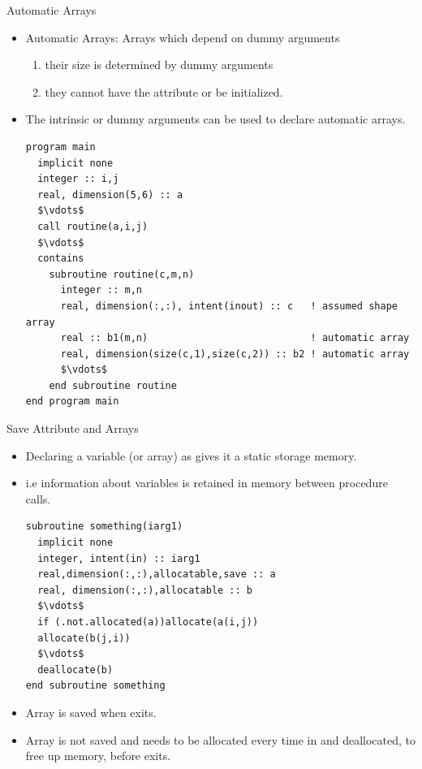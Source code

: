 \documentclass[10pt,t]{beamer}
\begin{document}
\begin{frame}[fragile]{Automatic Arrays}
  \begin{itemize}
    \item Automatic Arrays: Arrays which depend on dummy arguments
    \begin{enumerate}
      \scriptsize
      \item their size is determined by dummy arguments
      \item they cannot have the  attribute or be initialized.
    \end{enumerate}
    \item The  intrinsic or dummy arguments can be used to declare automatic arrays.
      \begin{lstlisting}[language={[90]Fortran},mathescape,basicstyle=\fontsize{6}{7}\selectfont\ttfamily]
program main
  implicit none
  integer :: i,j
  real, dimension(5,6) :: a
  $\vdots$
  call routine(a,i,j)
  $\vdots$
  contains
    subroutine routine(c,m,n)
      integer :: m,n
      real, dimension(:,:), intent(inout) :: c   ! assumed shape array
      real :: b1(m,n)                            ! automatic array
      real, dimension(size(c,1),size(c,2)) :: b2 ! automatic array
      $\vdots$
    end subroutine routine
end program main
      \end{lstlisting}
  \end{itemize}
\end{frame}

\begin{frame}[fragile]{Save Attribute and Arrays}
  \begin{itemize}
    \item Declaring a variable (or array) as  gives it a static storage memory.
    \item i.e information about variables is retained in memory between procedure calls.
      \begin{lstlisting}[language={[90]Fortran},mathescape,basicstyle=\fontsize{6}{7}\selectfont\ttfamily]
subroutine something(iarg1)
  implicit none
  integer, intent(in) :: iarg1 
  real,dimension(:,:),allocatable,save :: a 
  real, dimension(:,:),allocatable :: b 
  $\vdots$ 
  if (.not.allocated(a))allocate(a(i,j)) 
  allocate(b(j,i))
  $\vdots$
  deallocate(b)
end subroutine something
      \end{lstlisting}
    \item Array {} is saved when {} exits.
    \item Array {} is not saved and needs to be allocated every time in {}  and deallocated, to free up memory, before {} exits.
  \end{itemize}
\end{frame}
\end{document}
